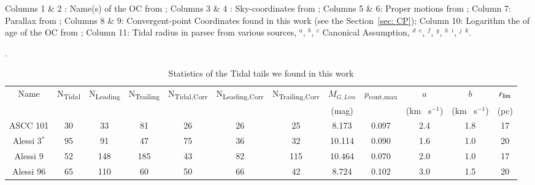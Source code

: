 \documentclass{aa}
\begin{document}
\begin{appendix}
\begin{landscape}
\begin{table}
\begin{tabular}{c c c c c c c c c c c}
    
\hline                                          
\end{tabular}
\vspace{0.5 cm}
  \par \textit{} Columns 1 \& 2 : Name(s) of the OC from ; Columns 3 \& 4 : Sky-coordinates from ; Columns 5 \& 6: Proper motions from  ; Column 7: Parallax from ; Columns 8 \& 9: Convergent-point Coordinates found in this work (see the Section~\ref{sec: CP}); Column 10: Logarithm the of age of the OC from ; Column 11: Tidal radius in parsec from various sources,
  $^a$\citet{10.1093/mnras/stac2906},
  $^b$\citet{2022ApJ...931..156Pang},
  $^c$ Canonical Assumption,
  $^d$\citet{2019A&A...621L...3Meingast}
  $^e$\citet{2019ApJ...877...12Tang}, 
  $^f$, 
  $^g$,
  $^h$\citet{2019AJ....157..115Yeh}
  $^i$\citet{2021AJ....162..171Ye}, 
  $^j$\citet{2023yCat..36720187Just}
  $^k$\citet{2011A&A...531A..92RoserHyades_Not_tails}.
\end{table}


\begin{table}
\centering
\caption{Statistics of the Tidal tails we found in this work}. 
\label{Table: Tidal tails}    
\begin{tabular}{c c c c c c c c c c c c }      
\hline\hline                       
Name & N\textsubscript{Tidal} & N\textsubscript{Leading} & N\textsubscript{Trailing} & N\textsubscript{Tidal,Corr}& N\textsubscript{Leading,Corr}&  N\textsubscript{Trailing,Corr}& 
$M_{G,Lim}$ & $p$\textsubscript{cont,max} & $a$  & $b$ & $r\textsubscript{lim}$ \\ 

 &  &  &   & &  &  & (mag) &  & (km \ s$^{-1}$)  & (km \ s$^{-1}$) & (pc) \\ 

\hline     
ASCC 101 & 30 & 33 & 81 & 26 & 26 & 25 & 8.173   & 0.097 & 2.4 & 1.8 & 17\\

Alessi 3$^*$ & 95 & 91 & 47 & 75 & 36 & 32 & 10.114 & 0.090 & 1.6 & 1.0 & 20\\

Alessi 9 & 52 & 148 & 185 & 43 & 82 & 115 & 10.464 &  0.070 & 2.0 & 1.0 & 17 \\    

Alessi 96 & 65 & 110 & 60 & 50 & 66 & 42 & 8.724  &0.102 & 3.0 & 1.5 & 20\\


\end{tabular}
\end{table}
\end{landscape}
\end{appendix}
\end{document}
